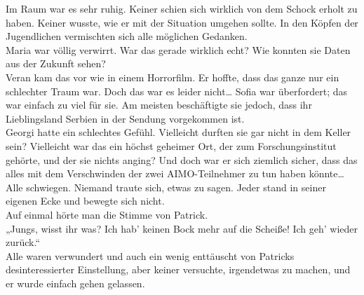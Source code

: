 \documentclass[oneside]{memoir}
\begin{document}
\noindent Im Raum war es sehr ruhig. Keiner schien sich wirklich von dem Schock erholt zu haben. Keiner wusste, wie er mit der Situation umgehen sollte.
In den Köpfen der Jugendlichen vermischten sich alle möglichen Gedanken. \\
Maria war völlig verwirrt. War das gerade wirklich echt? Wie konnten sie Daten aus der Zukunft sehen? \\
Veran kam das vor wie in einem Horrorfilm. Er hoffte, dass das ganze nur ein schlechter Traum war. Doch das war es leider nicht\ldots{} Sofia war überfordert; das war einfach zu viel für sie. Am meisten beschäftigte sie jedoch, dass ihr Lieblingsland Serbien in der Sendung vorgekommen ist. \\
Georgi hatte ein schlechtes Gefühl. Vielleicht durften sie gar nicht in dem Keller sein? Vielleicht war das ein höchst geheimer Ort, der zum Forschungsinstitut gehörte, und der sie nichts anging? Und doch war er sich ziemlich sicher, dass das alles mit dem Verschwinden der zwei AIMO-Teilnehmer zu tun haben könnte\ldots \\
Alle schwiegen. Niemand traute sich, etwas zu sagen. Jeder stand in seiner eigenen Ecke und bewegte sich nicht. \\
Auf einmal hörte man die Stimme von Patrick. \\
„Jungs, wisst ihr was? Ich hab' keinen Bock mehr auf die Scheiße! 
Ich geh' wieder zurück.“ \\
Alle waren verwundert und auch ein wenig enttäuscht von Patricks desinteressierter Einstellung, aber keiner versuchte, irgendetwas zu machen, und er wurde einfach gehen gelassen.
\end{document}
